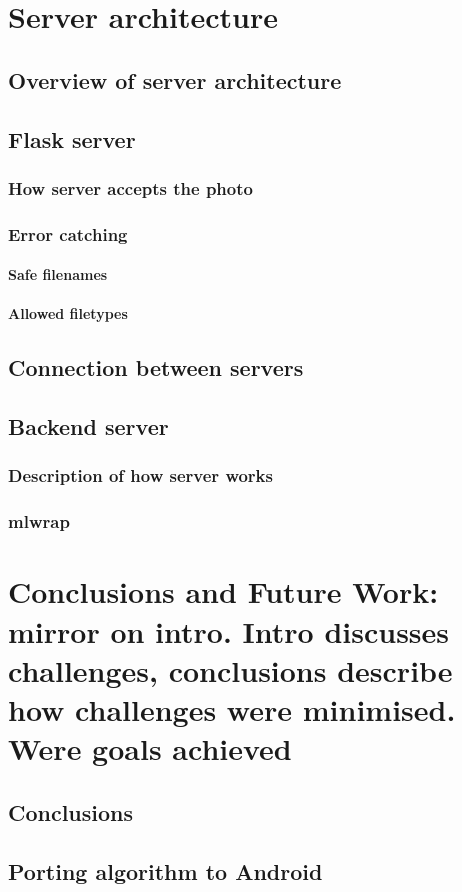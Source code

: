 \documentclass[11pt, a4paper]{report}
\begin{document}
\chapter{Server architecture}

\section{Overview of server architecture}

\section{Flask server}

\subsection{How server accepts the photo}

\subsection{Error catching}

\subsubsection{Safe filenames}

\subsubsection{Allowed filetypes}

\section{Connection between servers}

\section{Backend server}

\subsection{Description of how server works}

\subsection{mlwrap}








\chapter{Conclusions and Future Work: mirror on intro. Intro discusses challenges, conclusions describe how challenges were minimised. Were goals achieved}

\section{Conclusions}

\section{Porting algorithm to Android}
\end{document}
